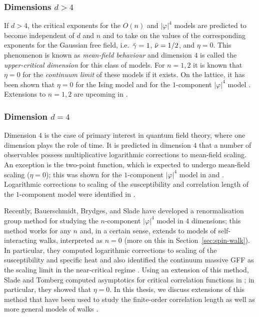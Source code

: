 \subsubsection{Dimensions $d > 4$}

If $d > 4$, the critical exponents for the $O(n)$ and $|\varphi|^4$ models are
predicted to become independent of $d$ and $n$ and to take on the values of the
corresponding exponents for the Gaussian free field, i.e.\ $\bar\gamma = 1$,
$\bar\nu = 1/2$, and $\eta = 0$.
This phenomenon is known as \emph{mean-field behaviour} and dimension $4$ is
called the \emph{upper-critical dimension} for this class of models.
For $n = 1, 2$ it is known that $\eta = 0$
for the \emph{continuum limit} of these models \cite{Aiz82,Fro82} if it exists.
On the lattice, it has been shown that $\eta = 0$ for 
the Ising model \cite{Sakai07}
and for the $1$-component $|\varphi|^4$ model 
\cite{Sakai15}. Extensions to $n = 1, 2$ are upcoming in \cite{BHH17}.

\subsubsection{Dimension $d = 4$}

Dimension $4$ is the case of primary interest in quantum field theory, where one
dimension plays the role of time.
It is predicted in dimension $4$ that a number of observables possess multiplicative
logarithmic corrections to mean-field scaling. An exception is the two-point function,
which is expected to undergo
mean-field scaling ($\eta = 0$); this was shown for the $1$-component $|\varphi|^4$
model in \cite{GK85} and \cite{FMRS87}. Logarithmic corrections to scaling of the
susceptibility and correlation length of the $1$-component model were identified in
\cite{Hara87,HT87}.

Recently, Bauerschmidt, Brydges, and Slade \cite{BS-rg-norm,BS-rg-loc,BBS-rg-pt,BS-rg-IE,BS-rg-step}
have developed a renormalisation group
method for studying the $n$-component $|\varphi|^4$ model in $4$ dimensions; this
method works for any $n$ and, in a certain sense, extends to models of
self-interacting walks, interpreted as $n = 0$ (more on this in
Section~\ref{sec:spin-walk}). In particular, they computed logarithmic corrections
to scaling of the susceptibility and specific heat and also identified the continuum
massive GFF as the scaling limit in the near-critical regime \cite{BBS-phi4-log}.
Using an extension of this method, Slade and
Tomberg computed asymptotics for critical correlation functions in \cite{ST-phi4};
in particular, they showed that $\eta = 0$.
In this thesis, we discuss extensions of this method that have been used to study
the finite-order correlation length \cite{BSTW-clp} as well as more general models
of walks \cite{BSW-saw-sa}.

